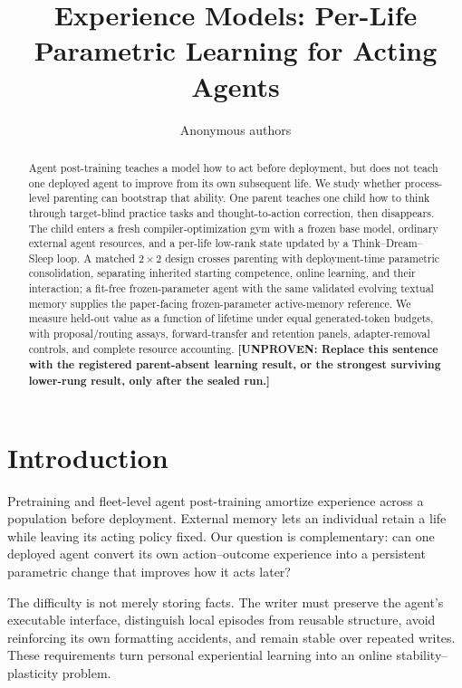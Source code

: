 \documentclass{article}
\title{Experience Models: Per-Life Parametric Learning for Acting Agents}
\author{Anonymous authors}
\newcommand{\unproven}[1]{\textbf{[UNPROVEN: #1]}}
\begin{document}
\maketitle

\begin{abstract}
Agent post-training teaches a model how to act before deployment, but does not
teach one deployed agent to improve from its own subsequent life. We study
whether process-level parenting can bootstrap that ability. One parent teaches
one child how to think through target-blind practice tasks and
thought-to-action correction, then disappears. The child enters a fresh
compiler-optimization gym with a frozen base model, ordinary external agent
resources, and a per-life low-rank state updated by a Think--Dream--Sleep
loop. A matched $2\times2$ design crosses parenting with deployment-time
parametric consolidation, separating inherited starting competence, online
learning, and their interaction; a fit-free frozen-parameter agent with the
same validated evolving textual memory supplies the paper-facing
frozen-parameter active-memory reference. We measure held-out value as a function of
lifetime under equal generated-token budgets, with proposal/routing assays,
forward-transfer and retention panels, adapter-removal controls, and complete
resource accounting. \unproven{Replace this sentence with the registered
parent-absent learning result, or the strongest surviving lower-rung result,
only after the sealed run.}
\end{abstract}

\section{Introduction}

Pretraining and fleet-level agent post-training amortize experience across a
population before deployment. External memory lets an individual retain a
life while leaving its acting policy fixed. Our question is complementary:
can one deployed agent convert its own action--outcome experience into a
persistent parametric change that improves how it acts later?

The difficulty is not merely storing facts. The writer must preserve the
agent's executable interface, distinguish local episodes from reusable
structure, avoid reinforcing its own formatting accidents, and remain stable
over repeated writes. These requirements turn personal experiential learning
into an online stability--plasticity problem.
\end{document}

